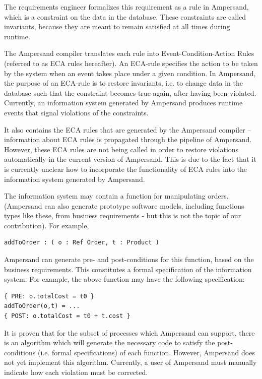 \documentclass[12pt]{report}
\begin{document}
The requirements engineer formalizes this requirement
as a rule in Ampersand, which is a constraint on the data in the database.
These constraints are called invariants, because they are meant to remain satisfied at
all times during runtime.

 The Ampersand compiler translates each rule into Event-Condition-Action Rules (referred to as ECA rules hereafter).
An ECA-rule specifies the action to be taken by the system when an event takes place
under a given condition. In Ampersand, the purpose of an ECA-rule is to restore
invariants, i.e. to change data in the database such that the constraint becomes true
again, after having been violated. Currently, an information system generated by
Ampersand produces runtime events that signal violations of the constraints. 

It also contains the ECA rules that are generated by the Ampersand compiler --
information about ECA rules is propagated through the pipeline of Ampersand. 
However, these ECA rules are not being called in order to restore
violations automatically in the current version of Ampersand. This is due to the
fact that it is currently unclear how to incorporate the functionality of ECA
rules into the information system generated by Ampersand. 

The information system may contain a function for manipulating orders. (Ampersand can also generate
prototype software models, including functions types like these, from business
requirements - but this is not the topic of our contribution). For example,

\begin{verbatim}
addToOrder : ( o : Ref Order, t : Product )
\end{verbatim}

Ampersand can generate pre- and post-conditions for this function, based on the
business requirements. This constitutes a formal specification of the
information system. For example, the above function may have the following specification:

\begin{verbatim}
{ PRE: o.totalCost = t0 } 
addToOrder(o,t) = ...
{ POST: o.totalCost = t0 + t.cost } 
\end{verbatim}

It is proven that for the subset of processes which Ampersand can support, 
there is an algorithm which will generate the necessary code to satisfy the 
post-conditions (i.e. formal specifications) of each function. However, 
Ampersand does not yet implement this algorithm. Currently, a user of Ampersand 
must manually indicate how each violation must be corrected.
\end{document}
